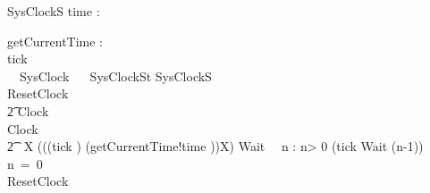 \documentclass{llncs}
\begin{document}
\begin{schema}{SysClockS}
 time : \nat
\end{schema}
\begin{circus}%
\circchannel getCurrentTime : \nat\\
\circchannel tick\\
  \circprocess\ ~SysClock ~\circdef~\circbegin
  \circstate SysClockSt  SysClockS\\
  ResetClock ~\circdef~
  \\\t2  Clock\\
  Clock ~\circdef~
  \\\t2  \circmu~X \circspot  (((tick \then \Skip) \interleave (getCurrentTime!time \then \Skip))\circseq X)
  Wait~\circdef~ \circvar n : \nat \circspot
   \circif n> 0 \circthen (tick \then Wait (n-1))
   \circelse n~=~0 \circthen \Skip
   \circfi\\
  \circspot ResetClock
  \circend
\end{circus}
\end{document}
